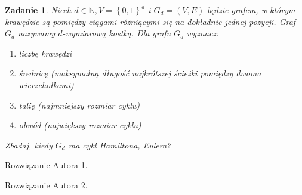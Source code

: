 \documentclass{mwart}
\newcommand{\N}{\mathbb{N}}
\newtheorem{zad}{Zadanie}[section]
\begin{document}
\begin{zad}
    Niech $d \in \N, V = \left\{0,1\right\}^d$ i $G_d=(V,E)$ będzie grafem, w którym krawędzie
    są pomiędzy ciągami różniącymi się na dokładnie jednej pozycji. Graf $G_d$ nazywamy
    $d$-wymiarową kostką. Dla grafu $G_d$ wyznacz:
    \begin{enumerate}
        \item liczbę krawędzi
        \item średnicę (maksymalną długość najkrótszej ścieżki pomiędzy dwoma wierzchołkami)
        \item talię (najmniejszy rozmiar cyklu)
        \item obwód (największy rozmiar cyklu)
    \end{enumerate}
    Zbadaj, kiedy $G_d$ ma cykl Hamiltona, Eulera?
\end{zad}
\begin{mdframed}
    Rozwiązanie Autora 1.
\end{mdframed}
\begin{mdframed}
    Rozwiązanie Autora 2.
\end{mdframed}
\end{document}
